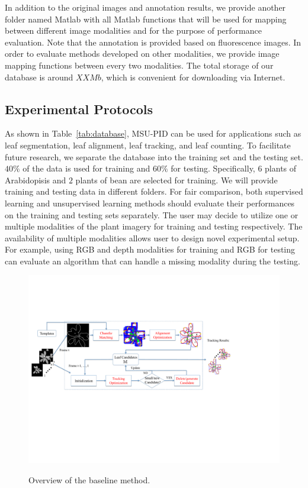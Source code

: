 In addition to the original images and annotation results, we provide another folder named Matlab with all Matlab functions that will be used for mapping between different image modalities and for the purpose of performance evaluation.
Note that the annotation is provided based on fluorescence images.
In order to evaluate methods developed on other modalities, we provide image mapping functions between every two modalities.
The total storage of our database is around $XX Mb$, which is convenient for downloading via Internet.

\subsection{Experimental Protocols}

As shown in Table~\ref{tab:database}, MSU-PID can be used for applications such as leaf segmentation, leaf alignment, leaf tracking, and leaf counting.
To facilitate future research, we separate the database into the training set and the testing set.
$40\%$ of the data is used for training and $60\%$ for testing.
Specifically, $6$ plants of Arabidopisis and $2$ plants of bean are selected for training.
We will provide training and testing data in different folders.
For fair comparison, both supervised learning and unsupervised learning methods should evaluate their performances on the training and testing sets separately.
The user may decide to utilize one or multiple modalities of the plant imagery for training and testing respectively.
The availability of multiple modalities allows user to design novel experimental setup. 
For example, using RGB and depth modalities for training and RGB for testing can evaluate an algorithm that can handle a missing modality during the testing.

\begin{figure}[t!]
\centering
\includegraphics[width=.98\textwidth]{Figures/overview}\\
\caption{Overview of the baseline method.}
\label{fig:methodOverview}
\end{figure}

